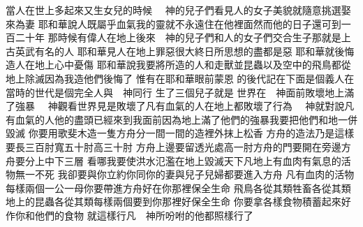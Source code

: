 \bchapter%
當人在世上多起來\chientien 又生女兒的時候\chientien 
{}　神的兒子們看見人的女子美貌\chientien 就隨意挑選\chientien 娶來為妻\chuan\Chuan
{}耶和華說\chientien 人既屬乎血氣\chientien 我的靈就不永遠住在他裡面\chientien 然而他的日子還可到一百二十年\chuan 
{}那時候有偉人在地上\chientien 後來　神的兒子們\chientien 和人的女子們交合生子\chientien 那就是上古英武有名的人\chuan 
{}耶和華見人在地上罪惡很大\chientien 終日所思想的盡都是惡\yuentien 
{}耶和華就後悔造人在地上\chientien 心中憂傷\chuan 
{}耶和華說\chientien 我要將所造的人\chientien 和走獸\chientien 並昆蟲\chientien 以及空中的飛鳥\chientien 都從地上除滅\chientien 因為我造他們後悔了\chuan 
{}惟有在耶和華眼前蒙恩\chuan\Chuan
{}的後代\chientien 記在下面\chuan{}是個義人\chientien 在當時的世代是個完全人\yuentien{}與　神同行\chuan 
{}生了三個兒子\chientien 就是\chientien{}\chuan 
{}世界在　神面前敗壞\yuentien 地上滿了強暴\chuan 
{}　神觀看世界\chientien 見是敗壞了\yuentien 凡有血氣的人\chientien 在地上都敗壞了行為\chuan 
{}　神就對說\chientien 凡有血氣的人\chientien 他的盡頭已經來到我面前\chientien 因為地上滿了他們的強暴\chientien 我要把他們和地一併毀滅\chuan 
{}你要用歌斐木造一隻方舟\chientien 分一間一間的造\chientien 裡外抹上松香\chuan 
{}方舟的造法乃是這樣\chientien 要長三百肘\chientien 寬五十肘\chientien 高三十肘\chuan 
{}方舟上邊要留透光處\chientien 高一肘\yuentien 方舟的門要開在旁邊\yuentien 方舟要分上\chientien 中\chientien 下三層\chuan 
{}看哪\chientien 我要使洪水氾濫在地上\chientien 毀滅天下\chientien 凡地上有血肉\chientien 有氣息的活物\chientien 無一不死\chuan 
{}我卻要與你立約\chientien 你同你的妻\chientien 與兒子\chientien 兒婦\chientien 都要進入方舟\chuan 
{}凡有血肉的活物\chientien 每樣兩個\chientien 一公一母\chientien 你要帶進方舟\chientien 好在你那裡保全生命\chuan 
{}飛鳥各從其類\chientien 牲畜各從其類\chientien 地上的昆蟲各從其類\chientien 每樣兩個\chientien 要到你那裡\chientien 好保全生命\chuan 
{}你要拿各樣食物積蓄起來\chientien 好作你和他們的食物\chuan 
{}就這樣行\yuentien 凡　神所吩咐的\chientien 他都照樣行了\chuan 
